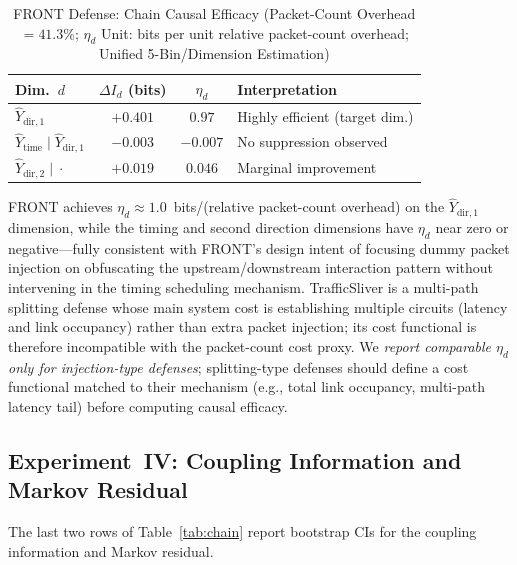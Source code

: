 \documentclass[lettersize,journal]{IEEEtran}
\begin{document}
\begin{table}[!t]
\centering\small
\caption{FRONT Defense: Chain Causal Efficacy
(Packet-Count Overhead $=41.3\%$;
$\eta_d$ Unit: bits per unit relative packet-count overhead;
Unified 5-Bin/Dimension Estimation)}
\label{tab:eta}
\begin{tabular}{p{2.2cm}ccp{2.8cm}}
\toprule
Dim.\ $d$ & $\Delta I_d$ (bits) & $\eta_d$ & Interpretation \\
\midrule
$\hat{Y}_{\mathrm{dir},1}$
  & $+0.401$ & $\mathbf{0.97}$
  & Highly efficient (target dim.) \\[2pt]
$\hat{Y}_{\mathrm{time}}\!\mid\!\hat{Y}_{\mathrm{dir},1}$
  & $-0.003$ & $-0.007$
  & No suppression observed \\[2pt]
$\hat{Y}_{\mathrm{dir},2}\!\mid\!\cdot$
  & $+0.019$ & $0.046$
  & Marginal improvement \\
\bottomrule
\end{tabular}
\end{table}

FRONT achieves $\eta_d\approx 1.0$~bits/(relative packet-count overhead)
on the $\hat{Y}_{\mathrm{dir},1}$ dimension, while the timing and second
direction dimensions have $\eta_d$ near zero or negative---fully
consistent with FRONT's design intent of focusing dummy packet injection
on obfuscating the upstream/downstream interaction pattern without
intervening in the timing scheduling mechanism.
TrafficSliver is a multi-path splitting defense whose main system cost is
establishing multiple circuits (latency and link occupancy) rather than
extra packet injection; its cost functional is therefore incompatible with
the packet-count cost proxy.
We \emph{report comparable $\eta_d$ only for injection-type defenses};
splitting-type defenses should define a cost functional matched to their
mechanism (e.g., total link occupancy, multi-path latency tail) before
computing causal efficacy.

\subsection{Experiment~IV: Coupling Information and Markov Residual}

The last two rows of Table~\ref{tab:chain} report bootstrap CIs for the
coupling information and Markov residual.
\end{document}
